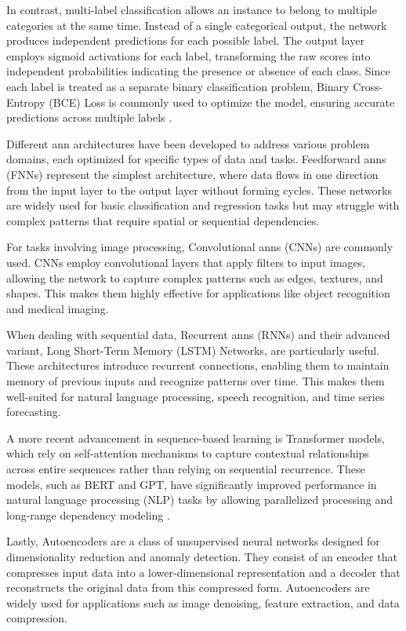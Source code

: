 In contrast, multi-label classification allows an instance to belong to multiple categories at the same time.
Instead of a single categorical output, the network produces independent predictions for each possible label.
The output layer employs sigmoid activations for each label, transforming the raw scores into independent probabilities indicating the presence or absence of each class.
Since each label is treated as a separate binary classification problem, Binary Cross-Entropy (BCE) Loss is commonly used to optimize the model, ensuring accurate predictions across multiple labels \cite{zhang2018binary}.

Different \ac{ann} architectures have been developed to address various problem domains, each optimized for specific types of data and tasks.
Feedforward \ac{ann}s (FNNs) represent the simplest architecture, where data flows in one direction from the input layer to the output layer without forming cycles.
These networks are widely used for basic classification and regression tasks but may struggle with complex patterns that require spatial or sequential dependencies.

For tasks involving image processing, Convolutional \ac{ann}s (CNNs) are commonly used.
CNNs employ convolutional layers that apply filters to input images, allowing the network to capture complex patterns such as edges, textures, and shapes.
This makes them highly effective for applications like object recognition and medical imaging.

When dealing with sequential data, Recurrent \ac{ann}s (RNNs) and their advanced variant, Long Short-Term Memory (LSTM) Networks, are particularly useful.
These architectures introduce recurrent connections, enabling them to maintain memory of previous inputs and recognize patterns over time.
This makes them well-suited for natural language processing, speech recognition, and time series forecasting.

A more recent advancement in sequence-based learning is Transformer models, which rely on self-attention mechanisms to capture contextual relationships across entire sequences rather than relying on sequential recurrence.
These models, such as BERT and GPT, have significantly improved performance in natural language processing (NLP) tasks by allowing parallelized processing and long-range dependency modeling \cite{vaswani2017attention}.

Lastly, Autoencoders are a class of unsupervised neural networks designed for dimensionality reduction and anomaly detection.
They consist of an encoder that compresses input data into a lower-dimensional representation and a decoder that reconstructs the original data from this compressed form.
Autoencoders are widely used for applications such as image denoising, feature extraction, and data compression.


